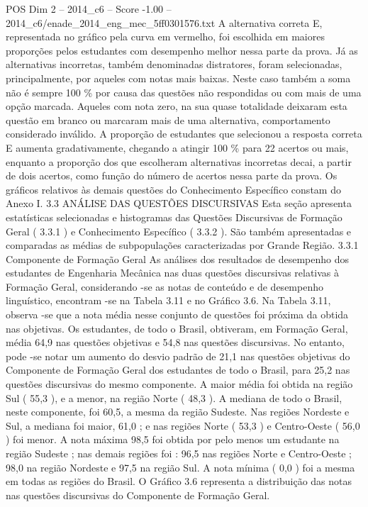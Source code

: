 \begin{textsample}{POS Dim 2 – 2014\_c6 – Score -1.00 – 2014\_c6/enade\_2014\_eng\_mec\_5ff0301576.txt}
A alternativa correta E, representada no gráfico pela curva em vermelho, foi escolhida em maiores proporções pelos estudantes com desempenho melhor nessa parte da prova.
Já as alternativas incorretas, também denominadas distratores, foram selecionadas, principalmente, por aqueles com notas mais baixas.
Neste caso também a soma não é sempre 100 \% por causa das questões não respondidas ou com mais de uma opção marcada.
Aqueles com nota zero, na sua quase totalidade deixaram esta questão em branco ou marcaram mais de uma alternativa, comportamento considerado inválido.
A proporção de estudantes que selecionou a resposta correta E aumenta gradativamente, chegando a atingir 100 \% para 22 acertos ou mais, enquanto a proporção dos que escolheram alternativas incorretas decai, a partir de dois acertos, como função do número de acertos nessa parte da prova.
Os gráficos relativos às demais questões do Conhecimento Específico constam do Anexo I. 3.3 ANÁLISE DAS QUESTÕES DISCURSIVAS Esta seção apresenta estatísticas selecionadas e histogramas das Questões Discursivas de Formação Geral ( 3.3.1 ) e Conhecimento Específico ( 3.3.2 ).
São também apresentadas e comparadas as médias de subpopulações caracterizadas por Grande Região. 3.3.1 Componente de Formação Geral As análises dos resultados de desempenho dos estudantes de Engenharia Mecânica nas duas questões discursivas relativas à Formação Geral, considerando -se as notas de conteúdo e de desempenho linguístico, encontram -se na Tabela 3.11 e no Gráfico 3.6.
Na Tabela 3.11, observa -se que a nota média nesse conjunto de questões foi próxima da obtida nas objetivas.
Os estudantes, de todo o Brasil, obtiveram, em Formação Geral, média 64,9 nas questões objetivas e 54,8 nas questões discursivas.
No entanto, pode -se notar um aumento do desvio padrão de 21,1 nas questões objetivas do Componente de Formação Geral dos estudantes de todo o Brasil, para 25,2 nas questões discursivas do mesmo componente.
A maior média foi obtida na região Sul ( 55,3 ), e a menor, na região Norte ( 48,3 ).
A mediana de todo o Brasil, neste componente, foi 60,5, a mesma da região Sudeste.
Nas regiões Nordeste e Sul, a mediana foi maior, 61,0 ; e nas regiões Norte ( 53,3 ) e Centro-Oeste ( 56,0 ) foi menor.
A nota máxima 98,5 foi obtida por pelo menos um estudante na região Sudeste ; nas demais regiões foi : 96,5 nas regiões Norte e Centro-Oeste ; 98,0 na região Nordeste e 97,5 na região Sul.
A nota mínima ( 0,0 ) foi a mesma em todas as regiões do Brasil.
O Gráfico 3.6 representa a distribuição das notas nas questões discursivas do Componente de Formação Geral.

\end{textsample}
